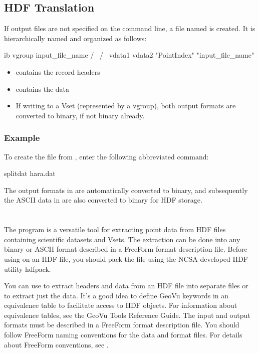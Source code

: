\subsection{HDF Translation}

If output files are not specified on the  command line,
a file named  is created. It is hierarchically
named and organized as follows:

\begin{vcode}{ib}
           vgroup
      input_file_name
          /      \
         /        \
     vdata1       vdata2
"PointIndex"      "input_file_name" 
\end{vcode}

\begin{itemize}
\item {} contains the record headers
\item {} contains the data
\item If writing to a Vset (represented by a vgroup), both output
  formats are converted to binary, if not binary already.
\end{itemize}

\subsubsection{Example}

To create the file  from , enter the
following abbreviated command:

\begin{example}
splitdat hara.dat 
\end{example}

The output formats in  are automatically converted to
binary, and subsequently the ASCII data in  are also
converted to binary for HDF storage.

\section{}
\label{ff,hdf,pntshow}

The \lit{pntshow} program is a versatile tool for extracting point
data  from HDF files containing scientific datasets and Vsets. The
extraction can be done into any binary or ASCII format described in a
FreeForm format description file. Before using \lit{pntshow} on an HDF
file, you should pack the file using the NCSA-developed HDF utility
hdfpack.

You can use  to extract headers and data from an HDF file
into separate files or to extract just the data. It's a good idea to
define GeoVu keywords in an equivalence table to facilitate access to
HDF objects. For information about equivalence tables, see the GeoVu
Tools Reference Guide. The input and output formats must be described
in a FreeForm format description file. You should follow FreeForm
naming conventions for the data and format files. For details about
FreeForm conventions, see \chapterref{ff,convs}.

